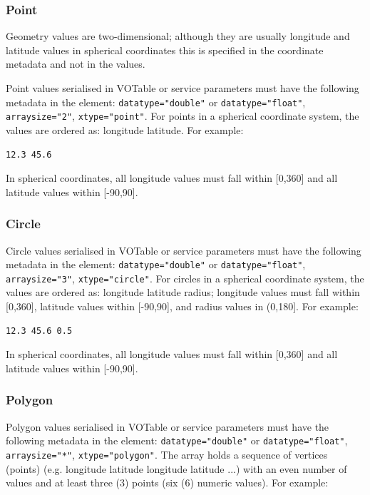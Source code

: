 \documentclass[11pt,letter]{ivoa}
\begin{document}
\subsubsection{Point}
Geometry values are two-dimensional; although they are usually longitude and 
latitude values in spherical coordinates this is specified in the coordinate 
metadata and not in the values. 

Point values serialised in VOTable or service parameters must have the following metadata in the 
 element: \verb|datatype="double"| or \verb|datatype="float"|, \verb|arraysize="2"|,
\verb|xtype="point"|. For points in a 
spherical coordinate system, the values are ordered as: longitude latitude. For 
example:

\begin{verbatim}
12.3 45.6
\end{verbatim}

In spherical coordinates, all longitude values must fall within [0,360] and all 
latitude values within [-90,90].

\subsubsection{Circle}
Circle values serialised in VOTable or service parameters must have the following metadata in the 
 element: \verb|datatype="double"| or \verb|datatype="float"|, \verb|arraysize="3"|,
\verb|xtype="circle"|. For circles 
in a spherical coordinate system, the values are ordered as: longitude latitude 
radius; longitude values must fall within [0,360], latitude values 
within [-90,90], and radius values in (0,180]. For example:

\begin{verbatim}
12.3 45.6 0.5
\end{verbatim}

In spherical coordinates, all longitude values must fall within [0,360] and all 
latitude values within [-90,90].

\subsubsection{Polygon}
Polygon values serialised in VOTable or service parameters must have the following metadata in the 
 element: \verb|datatype="double"| or \verb|datatype="float"|, \verb|arraysize="*"|,
\verb|xtype="polygon"|. The 
array holds a sequence of vertices (points) (e.g. longitude latitude longitude 
latitude ...) with an even number of values and at least three (3) points (six 
(6) numeric values). For example:
\end{document}

